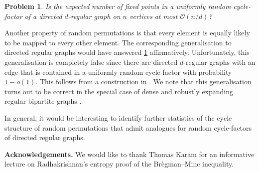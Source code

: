 \documentclass[11pt]{article}
\let\oldbibliography
\renewcommand{}[1]{
  {

    \hypersetup{linkcolor=cred}
    
    \oldbibliography{#1}
  }
}
\theoremstyle{plain}
\newtheorem{problem}[theorem]{Problem}
\theoremstyle{definition}
\newcommand{\cO}{\mathcal O}
\begin{document}
\begin{problem}\label{prob:fixedpointscyclefactor}
    Is the expected number of fixed points in a uniformly random cycle-factor of a directed $d$-regular graph on $n$ vertices at most $\cO(n/d)$?
\end{problem}

Another property of random permutations is that every element is equally likely to be mapped to every other element. The corresponding generalisation to directed regular graphs would have answered \cref{prob:fixedpointscyclefactor} affirmatively. Unfortunately, this generalisation is completely false since there are directed $d$-regular graphs with an edge that is contained in a uniformly random cycle-factor with probability $1-o(1)$. This follows from a construction in \cite[Theorem 1.7]{abert2016matchings}. We note that this generalisation turns out to be correct in the special case of dense and robustly expanding regular bipartite graphs \cite[Theorem 3.3]{granet2024random}.

In general, it would be interesting to identify further statistics of the cycle structure of random permutations that admit analogues for random cycle-factors of directed regular graphs.

\textbf{Acknowledgements.} We would like to thank Thomas Karam for an informative lecture on Radhakrishnan's entropy proof of the Br\`{e}gman--Minc inequality.


\end{document}
